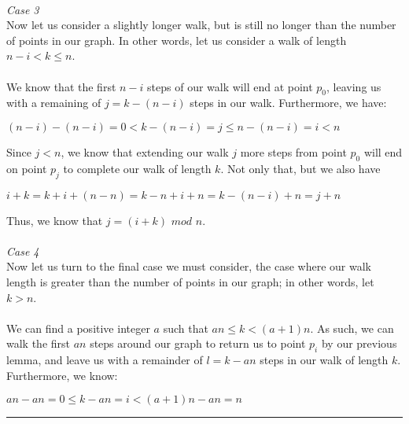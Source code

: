 \documentclass[a4paper,12pt]{article}
\begin{document}
\\
\textit{Case 3}\\
Now let us consider a slightly longer walk, but is still no longer than the number of points in our graph. In other words, let us consider a walk of length $n - i < k \leq n$.\\
\\
We know that the first $n - i$ steps of our walk will end at point $p_0$, leaving us with a remaining of $j = k - (n - i)$ steps in our walk. Furthermore, we have:
\begin{center}
$(n - i) - (n - i) = 0 < k - (n - i) = j \leq n - (n - i) = i < n$ 
\end{center}
Since $j < n$, we know that extending our walk $j$ more steps from point $p_0$ will end on point $p_j$ to complete our walk of length $k$. Not only that, but we also have
\begin{center}
$i + k = k + i + (n - n) = k - n + i + n = k - (n - i) + n = j + n$
\end{center} 
Thus, we know that $j = (i + k)$ $mod$ $n$.\\
\\
\textit{Case 4}\\
Now let us turn to the final case we must consider, the case where our walk length is greater than the number of points in our graph; in other words, let $k > n$.\\
\\
We can find a positive integer $a$ such that $an \leq k < (a + 1)n$. As such, we can walk the first $an$ steps around our graph to return us to point $p_i$ by our previous lemma, and leave us with a remainder of $l = k - an$ steps in our walk of length $k$. Furthermore, we know:
\begin{center} $an - an = 0 \leq k - an = i < (a + 1)n - an = n$ \end{center}
\begin{center}
\noindent\rule{8cm}{0.4pt}
\end{center}
\end{document}
